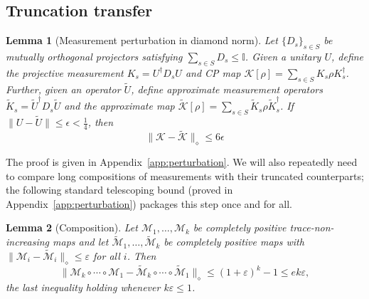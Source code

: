 \documentclass[aps,floatfix,10pt,amssymb,amsfont,amsmath,superscriptaddress,float,nofootinbib,longbibliography,nobalancelastpage,twocolumn]{revtex4-2}
\newtheorem{lemma}{Lemma}
\begin{document}
\subsection{Truncation transfer}
\label{subsec:transfer}
\begin{lemma}[Measurement perturbation in diamond norm]
\label{lemma:3}
Let $\{D_s\}_{s\in S}$ be mutually orthogonal projectors satisfying $\sum_{s\in S} D_s \leq \mathbb{I}$. Given a unitary $U$, define the projective measurement $K_s = U^{\dagger}D_s U$ and CP map $\mathcal{K}[\rho] = \sum_{s \in S} K_s\rho K_s^{\dagger}$. Further, given an operator $\tilde U$, define approximate measurement operators $\tilde K_s = \tilde U^{\dagger}D_s \tilde U$ and the approximate map $\tilde{\mathcal{K}}[\rho] = \sum_{s \in S} \tilde K_s\rho \tilde K_s^{\dagger}$. If $\|U-\tilde U\| \leq \epsilon<\frac14$, then 
\begin{equation}
    \|\mathcal{K} - \tilde{\mathcal{K}}\|_{\diamond} \leq 6\epsilon
\end{equation}
\end{lemma}
The proof is given in Appendix~\ref{app:perturbation}. We will also repeatedly need to compare long compositions of measurements with their truncated counterparts; the following standard telescoping bound (proved in Appendix~\ref{app:perturbation}) packages this step once and for all.
\begin{lemma}[Composition]
\label{lemma:composition}
Let $\mathcal{M}_1, \ldots, \mathcal{M}_k$ be completely positive trace-non-increasing maps and let $\tilde{\mathcal{M}}_1, \ldots, \tilde{\mathcal{M}}_k$ be completely positive maps with $\|\mathcal{M}_i - \tilde{\mathcal{M}}_i\|_{\diamond} \leq \varepsilon$ for all $i$. Then
\begin{equation}
    \|\mathcal{M}_k \circ \cdots \circ \mathcal{M}_1 - \tilde{\mathcal{M}}_k \circ \cdots \circ \tilde{\mathcal{M}}_1\|_{\diamond} \leq (1+\varepsilon)^k - 1 \leq e k \varepsilon,
\end{equation}
the last inequality holding whenever $k\varepsilon \leq 1$.
\end{lemma}
\end{document}
